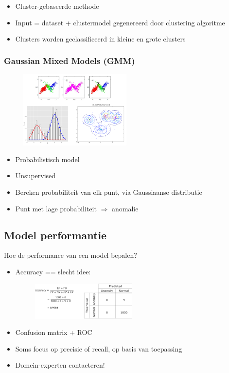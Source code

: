 \documentclass{article}
\begin{document}
\begin{itemize}
    \item Cluster-gebaseerde methode
    \item Input = dataset + clustermodel gegenereerd door clustering algoritme
    \item Clusters worden geclassificeerd in kleine en grote clusters
\end{itemize}

\subsubsection{Gaussian Mixed Models (GMM)}

\begin{figure}[H]
    \centering
    \includegraphics[width=0.5\textwidth]{gmm.png}
\end{figure}


\begin{itemize}
    \item Probabilistisch model
    \item Unsupervised
    \item Bereken probabiliteit van elk punt, via Gaussiaanse distributie
    \item Punt met lage probabiliteit $\Rightarrow$ anomalie
\end{itemize}

\subsection{Model performantie}

Hoe de performance van een model bepalen?

\begin{itemize}
    \item Accuracy == slecht idee:
    \begin{figure}[H]
        \centering
        \includegraphics[width=0.5\textwidth]{anomaly-accuracy.png}
    \end{figure}
    \item Confusion matrix + ROC
    \item Soms focus op precisie of recall, op basis van toepassing
    \item Domein-experten contacteren!
\end{itemize}
\end{document}
